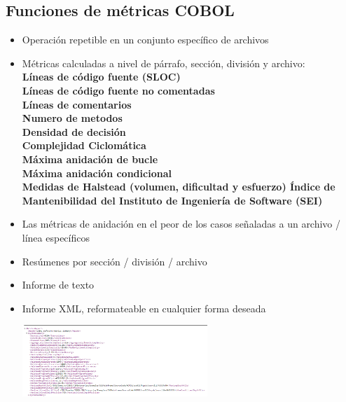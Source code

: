 \documentclass[twoside,twocolumn]{article}
\begin{document}
\subsection{Funciones de métricas COBOL}
\begin{itemize}
\item Operación repetible en un conjunto específico de archivos
\item Métricas calculadas a nivel de párrafo, sección, división y archivo:
\\ \textbf{ Líneas de código fuente (SLOC)}
\\ \textbf{ Líneas de código fuente no comentadas}
\\ \textbf{ Líneas de comentarios}
\\ \textbf{ Numero de metodos}
\\ \textbf{ Densidad de decisión}
\\ \textbf{ Complejidad Ciclomática}
\\ \textbf{ Máxima anidación de bucle}
\\ \textbf{ Máxima anidación condicional}
\\ \textbf{ Medidas de Halstead (volumen, dificultad y esfuerzo)
Índice de Mantenibilidad del Instituto de Ingeniería de Software (SEI)}
\item Las métricas de anidación en el peor de los casos señaladas a un archivo / línea específicos
\item Resúmenes por sección / división / archivo
\item Informe de texto
\item Informe XML, reformateable en cualquier forma deseada
\begin{center}
	\includegraphics[width=7cm]{./Imagenes/cobol} 
	\end{center}

\end{itemize}
\end{document}

